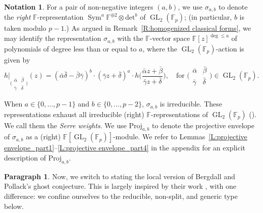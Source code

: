 \documentclass[12pt]{amsart}
\theoremstyle{definition}
\newtheorem{notation}[subsection]{Notation}
\newtheorem{para}[subsection]{Paragraph}
\numberwithin{equation}{subsection}
\def\FF{\mathbb{F}}
\newcommand{\Proj}{\mathrm{Proj}}
\DeclareMathOperator{\GL}{GL}
\DeclareMathOperator{\Sym}{Sym}
\renewcommand{\det}{\mathrm{det}}
\newcommand{\Matrix}[4]{{\big(\begin{smallmatrix}#1&#2\\#3& #4\end{smallmatrix} \big)}}
\begin{document}
\begin{notation}
\label{N:Serre weights}
For a pair of non-negative integers $(a,b)$, we use $\sigma_{a,b}$ to denote the \emph{right} $\FF$-representation $\Sym^a\FF^{\oplus 2} \otimes \det^b$ of $\GL_2(\FF_p)$; (in particular, $b$ is taken modulo $p-1$.) As argued in Remark~\ref{R:homogenized classical forms}, we may identify the representation $\sigma_{a,b}$ with the
$\FF$-vector space $\FF[z]^{\deg \leq a}$ of polynomials of degree less than or equal to $a$, where the $\GL_2(\FF_p)$-action is given by
$$
h|_{\Matrix {\bar \alpha}{\bar\beta}{\bar\gamma}{\bar\delta}}(z) =(\bar\alpha\bar\delta-\bar\beta\bar\gamma)^b \cdot  (\bar\gamma z+\bar\delta)^{a}\cdot  h\Big( \frac{\bar\alpha z+\bar\beta}{\bar\gamma z+\bar\delta}\Big), \quad \textrm{for }\Matrix {\bar \alpha}{\bar\beta}{\bar\gamma}{\bar\delta} \in \GL_2(\FF_p).
$$

When $a \in \{0, \dots, p-1\}$ and $b \in \{0, \dots, p-2\}$, $\sigma_{a,b}$ is irreducible. These representations exhaust all irreducible (right) $\FF$-representations of $\GL_2(\FF_p)$ (\cite[Proposition~1]{Barthel-Livne}). We call them the \emph{Serre weights}.
We use $\Proj_{a,b}$ to denote the projective envelope of $\sigma_{a,b}$ as a (right) $\FF[\GL_2(\FF_p)]$-module. We refer to Lemmas~\ref{L:projective envelope_part1}--\ref{L:projective envelope_part4} in the appendix for an explicit description of $\Proj_{a,b}$.
\end{notation}



\begin{para}
\label{P:para_105}
Now, we switch to stating the local version of Bergdall and Pollack's ghost conjecture. This is largely inspired by their work
\cite{bergdall-pollack2,bergdall-pollack3}, with one difference: we confine ourselves to the reducible, non-split, and generic type below.
\end{para}
\end{document}
